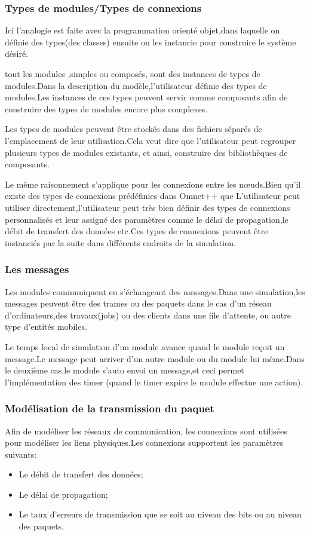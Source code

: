\subsubsection{Types de modules/Types de connexions }
Ici l'analogie est faite avec la programmation orienté objet,dans laquelle on définie des types(des classes) ensuite on les instancie pour construire le système désiré.

tout les modules ,simples ou composés, sont des instances de types de modules.Dans la description du modèle,l'utilisateur définie des types de modules.Les instances de ces types peuvent servir comme composants afin de construire des types de modules encore plus complexes.

Les types de modules peuvent être stockés dans des fichiers séparés de l'emplacement de leur utilisation.Cela veut dire que l'utilisateur peut regrouper plusieurs types de modules existants, et ainsi, construire des bibliothèques de composants.

Le même raisonnement s'applique pour les connexions entre les nœuds.Bien qu'il existe des types de connexions prédéfinies dans Omnet++ que L'utilisateur peut utiliser directement,l'utilisateur peut très bien définir des types de connexions  personnalisés et leur assigné des paramètres comme le délai de propagation,le débit de transfert des données etc.Ces types de connexions peuvent être instanciés par la suite dans différents endroits de la simulation. 
\subsubsection{Les messages}
Les modules communiquent en s'échangeant des messages.Dans une simulation,les messages peuvent être des trames ou des paquets dans le cas d'un réseau d'ordinateurs,des travaux(jobs) ou des clients dans une file d'attente, ou autre type d'entités mobiles.

Le temps local de simulation d'un module avance quand le module reçoit un message.Le message peut arriver d'un autre module ou du module lui même.Dans le deuxième cas,le module s'auto envoi un message,et ceci permet l'implémentation des timer (quand le timer expire le module effectue une action).
\subsubsection{Modélisation de la transmission du paquet}
Afin de modéliser les réseaux de communication,
les connexions sont utilisées pour modéliser les liens physiques.Les connexions supportent les paramètres suivants:
\begin{itemize}
\item Le débit de transfert des données;
\item Le délai de propagation;
\item Le taux d'erreurs de transmission que se soit au niveau des bits ou au niveau des paquets.
\end{itemize}

